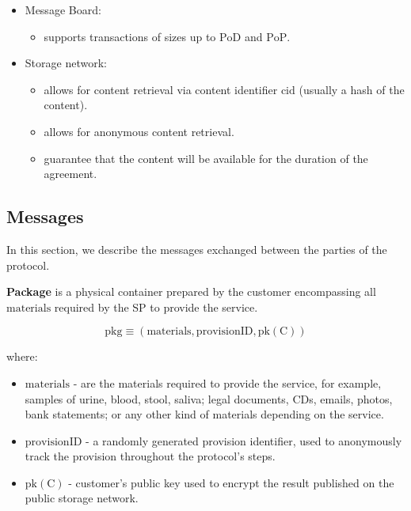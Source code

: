 \documentclass[pdftex,twocolumn,epjc3]{svjour3}
\begin{document}
{\begin{itemize}
\item Message Board:
    \begin{itemize}
        \item supports transactions of sizes up to $\mathrm{PoD}$ and $\mathrm{PoP}$.
    \end{itemize}

\item Storage network:
    \begin{itemize}
        \item allows for content retrieval via content identifier $\mathrm{cid}$ (usually a hash of the content).
        \item allows for anonymous content retrieval.
        \item guarantee that the content will be available for the duration of the agreement.
    \end{itemize}
\end{itemize}

\subsection{Messages}\label{messages}
In this section, we describe the messages exchanged between the parties of the protocol.

\vspace{5mm}

\noindent \textbf
{Package}\label{package} is a physical container prepared by the customer encompassing all $\mathrm{materials}$ required by the SP to provide the service.

$$\mathrm{pkg} \equiv (\mathrm{materials}, \mathrm{provisionID}, \mathrm{pk(C)})$$

where:

\begin{itemize}

\item $\mathrm{materials}$ - are the materials required to provide the service, for example, samples of urine, blood, stool, saliva; legal documents, CDs, emails, photos, bank statements; or any other kind of materials depending on the service.
\item $\mathrm{provisionID}$ - a randomly generated provision identifier, used to anonymously track the provision throughout the protocol's steps.
\item $\mathrm{pk(C)}$ - customer's public key used to encrypt the result published on the public storage network.
\end{itemize}

}
\end{document}
